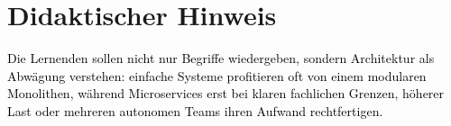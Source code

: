 \documentclass[11pt,a4paper]{article}
\newcommand{\solution}[1]{\textcolor{black}{#1}}
\begin{document}
\section*{Didaktischer Hinweis}
\solution{Die Lernenden sollen nicht nur Begriffe wiedergeben, sondern Architektur als Abwägung verstehen: einfache Systeme profitieren oft von einem modularen Monolithen, während Microservices erst bei klaren fachlichen Grenzen, höherer Last oder mehreren autonomen Teams ihren Aufwand rechtfertigen.}
\end{document}
